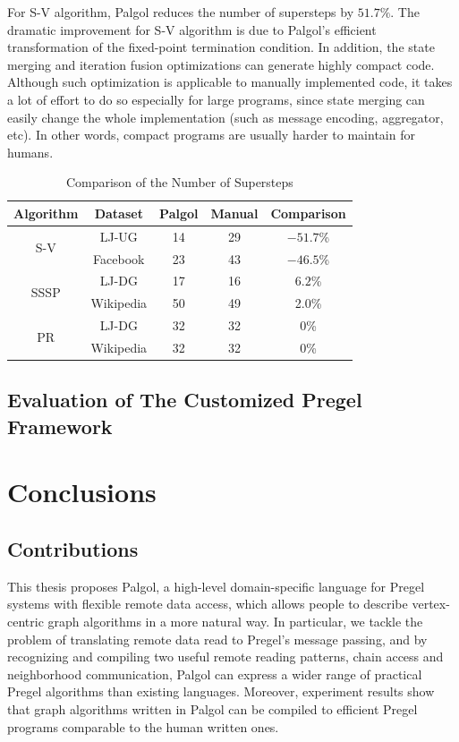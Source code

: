 \documentclass{sokendai_thesis} %
\begin{document}
For S-V algorithm, Palgol reduces the number of supersteps by $51.7\%$.
The dramatic improvement for S-V algorithm is due to Palgol's efficient transformation of the fixed-point termination condition.
In addition, the state merging and iteration fusion optimizations can generate highly compact code.
Although such optimization is applicable to manually implemented code, it takes a lot of effort to do so especially for large programs, since state merging can easily change the whole implementation (such as message encoding, aggregator, etc).
In other words, compact programs are usually harder to maintain for humans.

\begin{table}[t]
 \centering
 \caption{Comparison of the Number of Supersteps}
 \label{tab:steps}
 \begin{tabular}{c|c|c|c|c}
  \hline
  \textbf{Algorithm} & \textbf{Dataset} & Palgol & Manual & Comparison \\
  \hline\hline
  \multirow{2}{*}{S-V} & LJ-UG & 14 & 29 & $-51.7$\% \\
  \cline{2-5}
  & Facebook & 23 & 43 & $-46.5$\% \\
  \hline
  \multirow{2}{*}{SSSP} & LJ-DG & 17 & 16 & $6.2$\% \\
  \cline{2-5}
  & Wikipedia & 50 & 49 & 2.0\% \\
  \hline
  \multirow{2}{*}{PR} & LJ-DG & 32 & 32 & $0$\% \\
  \cline{2-5}
  & Wikipedia & 32 & 32 & $0$\% \\
  \hline
 \end{tabular}
\vspace{-2ex}\end{table}

\section{Evaluation of The Customized Pregel Framework}

\chapter{Conclusions}
\label{sec:conclusions}

\section{Contributions}

This thesis proposes Palgol, a high-level domain-specific language for Pregel systems with flexible remote data access, which allows people to describe vertex-centric graph algorithms in a more natural way.
In particular, we tackle the problem of translating remote data read to Pregel's message passing, and by recognizing and compiling two useful remote reading patterns, chain access and neighborhood communication, Palgol can express a wider range of practical Pregel algorithms than existing languages.
Moreover, experiment results show that graph algorithms written in Palgol can be compiled to efficient Pregel programs comparable to the human written ones.
\end{document}
